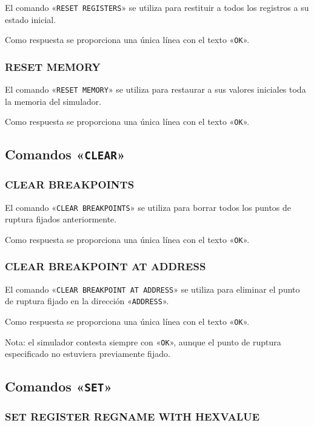 \documentclass[notitlepage,11pt,a4paper,final,twoside]{article}
\begin{document}
El comando «\texttt{RESET REGISTERS}» se utiliza para restituir a
todos los registros a su estado inicial.

Como respuesta se proporciona una única línea con el texto
«\texttt{OK}».

\subsubsection{RESET MEMORY}

El comando «\texttt{RESET MEMORY}» se utiliza para restaurar a sus
valores iniciales toda la memoria del simulador.

Como respuesta se proporciona una única línea con el texto
«\texttt{OK}».


\subsection{Comandos «\texttt{CLEAR}»}

\subsubsection{CLEAR BREAKPOINTS}

El comando «\texttt{CLEAR BREAKPOINTS}» se utiliza para borrar todos
los puntos de ruptura fijados anteriormente.

Como respuesta se proporciona una única línea con el texto
«\texttt{OK}».

\subsubsection{CLEAR BREAKPOINT AT ADDRESS}

El comando «\texttt{CLEAR BREAKPOINT AT ADDRESS}» se utiliza para
eliminar el punto de ruptura fijado en la dirección
«\texttt{ADDRESS}».

Como respuesta se proporciona una única línea con el texto
«\texttt{OK}».

Nota: el simulador contesta siempre con «\texttt{OK}», aunque el punto
de ruptura especificado no estuviera previamente fijado.

\subsection{Comandos «\texttt{SET}»}

\subsubsection{SET REGISTER REGNAME WITH HEXVALUE}
\end{document}
